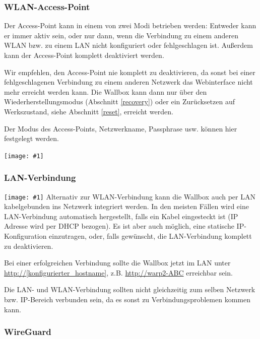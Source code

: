 \documentclass[a4paper,10pt]{article}
\newcommand{\hint}[1]{\begin{tcolorbox}[colback=boxgray,colframe=black,coltext=
white,title=Hinweis,left*=2mm,right*=2mm,boxsep=1mm,bottom=1mm,top=1mm]#1\end{tcolorbox}}
\newcommand{\gfx}[1]{\texttt{[image: \#1]}}
\begin{document}
\begin{multicols*}{2}
    \vspace{-0.4cm}
    \subsubsection{WLAN-Access-Point}
    \vspace{-0.1cm}
    Der Access-Point kann in einem von zwei Modi betrieben werden: Entweder kann er immer aktiv sein,
    oder nur dann, wenn die Verbindung zu einem anderen WLAN bzw. zu einem LAN nicht konfiguriert oder fehlgeschlagen ist.
    Außerdem kann der Access-Point komplett deaktiviert werden.
    \hint{Wir empfehlen, den Access-Point nie komplett zu deaktivieren, da sonst bei einer
        fehlgeschlagenen Verbindung zu einem anderen Netzwerk das Webinterface nicht mehr erreicht
        werden kann. Die Wallbox kann dann nur über den Wiederherstellungsmodus
        (Abschnitt \ref{recovery}) oder ein Zurücksetzen auf Werkszustand, siehe Abschnitt \ref{reset}, erreicht werden.}

    Der Modus des Access-Points, Netzwerkname, Passphrase usw. können hier festgelegt werden.

    \gfx{./img_warp2/resized/web_wifi_ap}

    \subsubsection{LAN-Verbindung}
    \gfx{./img_warp2/resized/web_ethernet}
    Alternativ zur WLAN-Verbindung kann die Wallbox auch per LAN kabelgebunden
    ins Netzwerk integriert werden. In den meisten Fällen wird eine
    LAN-Verbindung automatisch hergestellt, falls ein Kabel eingesteckt ist
    (IP Adresse wird per DHCP bezogen). Es ist aber auch möglich,
    eine statische IP-Konfiguration    einzutragen, oder, falls gewünscht, die LAN-Verbindung
    komplett zu deaktivieren.

    Bei einer erfolgreichen Verbindung sollte die Wallbox jetzt im LAN unter
    \url{http://[konfigurierter_hostname]}, z.B. \url{http://warp2-ABC} erreichbar sein.

    \hint{Die LAN- und WLAN-Verbindung sollten nicht gleichzeitig zum selben Netzwerk bzw. IP-Bereich verbunden sein,
    da es sonst zu Verbindungsproblemen kommen kann.}

    \subsubsection{WireGuard}


\end{multicols*}
\end{document}

